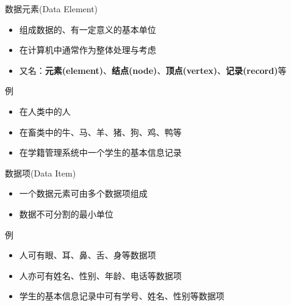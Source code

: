 \begin{frame}{\insertsubsectionhead}
    \begin{block}{数据元素(Data Element)}
        \begin{itemize}
            \item 组成数据的、有一定意义的\alert{基本}单位
            \item 在计算机中通常作为\alert{整体}处理与考虑
            \item 又名：\textbf{元素(element)}、\textbf{结点(node)}、\textbf{顶点(vertex)}、\textbf{记录(record)}等
        \end{itemize}
    \end{block}
    \pause
    \begin{exampleblock}{例}
        \begin{itemize}
            \item 在人类中的\alert{人}
            \item 在畜类中的\alert{牛、马、羊、猪、狗、鸡、鸭}等
            \item 在学籍管理系统中一个学生的\alert{基本信息记录}
        \end{itemize}
    \end{exampleblock}
\end{frame}

\begin{frame}{\insertsubsectionhead}
    \begin{block}{数据项(Data Item)}
        \begin{itemize}
            \item 一个数据元素可由多个数据项组成
            \item 数据不可分割的\alert{最小}单位
        \end{itemize}
    \end{block}
    \pause
    \begin{exampleblock}{例}
        \begin{itemize}
            \item 人可有\alert{眼、耳、鼻、舌、身}等数据项
            \item 人亦可有\alert{姓名、性别、年龄、电话}等数据项
            \item 学生的基本信息记录中可有\alert{学号、姓名、性别}等数据项
        \end{itemize}
    \end{exampleblock}
\end{frame}

